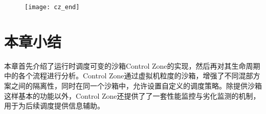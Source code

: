 \begin{figure}[!htbp]
    \centering
    \texttt{[image: cz\_end]}
    \label{fig:cz_end}
\end{figure}


\section{本章小结}

本章首先介绍了运行时调度可变的沙箱Control Zone的实现，然后再对其生命周期中的各个流程进行分析。Control Zone通过虚拟机粒度的沙箱，增强了不同混部方案之间的隔离性，同时在同一个沙箱中，允许设置自定义的调度策略。除提供沙箱这样基本的功能以外，Control Zone还提供了了一套性能监控与劣化监测的机制，用于为后续调度提供信息辅助。